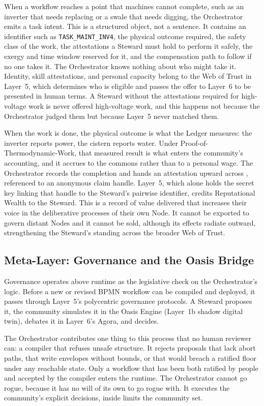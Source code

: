 When a workflow reaches a point that machines cannot complete, such as an inverter that needs replacing or a swale that needs digging, the Orchestrator emits a task intent. This is a structured object, not a sentence. It contains an identifier such as \texttt{TASK\_MAINT\_INV4}, the physical outcome required, the safety class of the work, the attestations a Steward must hold to perform it safely, the exergy and time window reserved for it, and the compensation path to follow if no one takes it. The Orchestrator knows nothing about who might take it. Identity, skill attestations, and personal capacity belong to the Web of Trust in Layer~5, which determines who is eligible and passes the offer to Layer~6 to be presented in human terms. A Steward without the attestations required for high-voltage work is never offered high-voltage work, and this happens not because the Orchestrator judged them but because Layer~5 never matched them.

When the work is done, the physical outcome is what the Ledger measures: the inverter reports power, the cistern reports water. Under Proof-of-Thermodynamic-Work, that measured result is what enters the community's accounting, and it accrues to the commons rather than to a personal wage. The Orchestrator records the completion and hands an attestation upward across , referenced to an anonymous claim handle. Layer~5, which alone holds the secret key linking that handle to the Steward's pairwise identifier, credits Reputational Wealth to the Steward. This is a record of value delivered that increases their voice in the deliberative processes of their own Node. It cannot be exported to govern distant Nodes and it cannot be sold, although its effects radiate outward, strengthening the Steward's standing across the broader Web of Trust.

\subsection{Meta-Layer: Governance and the Oasis Bridge}

Governance operates above runtime as the legislative check on the Orchestrator's logic. Before a new or revised BPMN workflow can be compiled and deployed, it passes through Layer~5's polycentric governance protocols. A Steward proposes it, the community simulates it in the Oasis Engine (Layer~1b shadow digital twin), debates it in Layer~6's Agora, and decides.

The Orchestrator contributes one thing to this process that no human reviewer can: a compiler that refuses unsafe structure. It rejects proposals that lack abort paths, that write envelopes without bounds, or that would breach a ratified floor under any reachable state. Only a workflow that has been both ratified by people and accepted by the compiler enters the runtime. The Orchestrator cannot go rogue, because it has no will of its own to go rogue with. It executes the community's explicit decisions, inside limits the community set.

